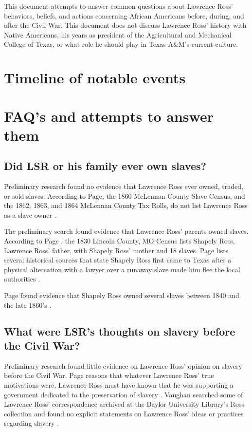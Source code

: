 \documentclass[12pt]{article}
\begin{document}
This document attempts to answer common questions about Lawrence Ross' behaviors, beliefs, and actions concerning African Americans before, during, and after the Civil War. This document does not discuss Lawrence Ross' history with Native Americans, his years as president of the Agricultural and Mechanical College of Texas, or what role he should play in Texas A\&M's current culture. 

\newpage
\section{Timeline of notable events}


\newpage
\section{FAQ's and attempts to answer them}

\subsection{Did LSR or his family ever own slaves? }
Preliminary research found no evidence that Lawrence Ross ever owned, traded, or sold slaves. According to Page, the 1860 McLennan County Slave Census, and the 1862, 1863, and 1864 McLennan County Tax Rolls, do not list Lawrence Ross as a slave owner \cite[pg.49]{page}.

The preliminary search found evidence that Lawrence Ross' parents owned slaves. According to Page \cite[pg.49]{page}, the 1830 Lincoln County, MO Census lists Shapely Ross, Lawrence Ross' father, with Shapely Ross' mother and 18 slaves. Page lists several historical sources that state Shapely Ross first came to Texas after a physical altercation with a lawyer over a runaway slave made him flee the local authorities \cite[pg.50--51]{page}. 

Page found evidence that Shapely Ross owned several slaves between 1840 and the late 1860's  \cite[pg.51--55]{page}. 

\subsection{What were LSR's thoughts on slavery before the Civil War? }
Preliminary research found little evidence on Lawrence Ross' opinion on slavery before the Civil War. Page reasons that whatever Lawrence Ross' true motivations were, Lawrence Ross must have known that he was supporting a government dedicated to the preservation of slavery \cite[pg. 59]{page}. Vaughan searched some of Lawrence Ross' correspondence archived at the Baylor University Library's Ross collection and found no explicit statements on Lawrence Ross' ideas or practices regarding slavery \cite{vaughan:email}. 
\end{document}
